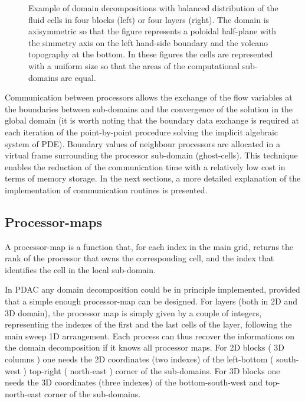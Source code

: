 %
\begin{figure}[htb]
\setlength{\unitlength}{1mm}
\begin{center}
\begin{minipage}{6cm}
\centerline{}
\end{minipage}
\begin{minipage}{6cm}
\centerline{}
\end{minipage}
\begin{minipage}{6cm}
\centerline{}
\end{minipage}
\end{center}
\caption{Example of domain decompositions with balanced distribution of
the fluid cells in four blocks (left) or four layers (right).
The domain is axisymmetric so that the figure represents a poloidal
half-plane with the simmetry axis on the left hand-side boundary and
the volcano topography at the bottom. In these figures the cells are represented
with a uniform size so that the areas of the computational sub-domains
are equal.\label{fig:Ves_part}}
\end{figure}
%

Communication between processors allows the exchange of the flow variables
at the boundaries between sub-domains and the convergence of the solution
in the global domain (it is worth noting that the
boundary data exchange is required at each iteration of the point-by-point
procedure solving the implicit algebraic system of PDE).
Boundary values of neighbour processors are allocated in a virtual
frame surrounding the processor sub-domain (ghost-cells). This technique
enables the reduction of the communication time with a relatively low cost
in terms of memory storage.
In the next sections, a more detailed explanation of the implementation of communication
routines is presented.
%
\subsection{Processor-maps}
A processor-map is a function that, for each index in the main grid, returns the rank
of the processor that owns the corresponding cell, and the index that identifies the
cell in the local sub-domain.

In PDAC any domain decomposition could be in principle implemented, provided that a 
simple enough processor-map can be designed.
For layers (both in 2D and 3D domain), the processor map is simply given by a couple of integers,
representing the indexes of the first and the last cells of the layer, following
the main sweep 1D arrangement.  Each process can thus recover
the informations on the domain decomposition if it knows all processor maps.
For 2D blocks ( 3D columns ) one needs the 2D coordinates (two indexes) of the left-bottom ( south-west )
top-right ( north-east ) corner of the sub-domains.
For 3D blocks one needs the 3D coordinates (three indexes) of the bottom-south-west and
top-north-east corner of the sub-domains.

